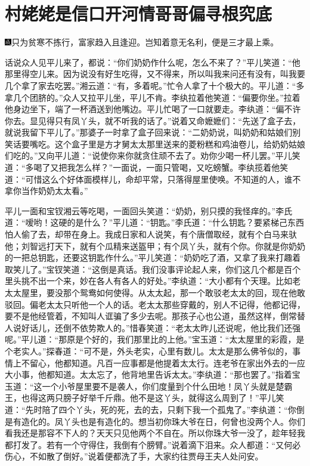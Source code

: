 

\chapter{村姥姥是信口开河\hspace{.5em}情哥哥偏寻根究底}

{\includegraphics[width=3mm]{../Images/00005}只为贫寒不拣行，富家趋入且逢迎。岂知着意无名利，便是三才最上乘。}

话说众人见平儿来了，都说：``你们奶奶作什么呢，怎么不来了？''平儿笑道：``他那里得空儿来。因为说没有好生吃得，又不得来，所以叫我来问还有没有，叫我要几个拿了家去吃罢。''湘云道：``有，多着呢。''忙令人拿了十个极大的。平儿道：``多拿几个团脐的。''众人又拉平儿坐，平儿不肯。李纨拉着他笑道：``偏要你坐。''拉着他身边坐下，端了一杯酒送到他嘴边。平儿忙喝了一口就要走。李纨道：``偏不许你去。显见得只有凤丫头，就不听我的话了。''说着又命嬷嬷们：``先送了盒子去，就说我留下平儿了。''那婆子一时拿了盒子回来说：``二奶奶说，叫奶奶和姑娘们别笑话要嘴吃。这个盒子里是方才舅太太那里送来的菱粉糕和鸡油卷儿，给奶奶姑娘们吃的。''又向平儿道：``说使你来你就贪住顽不去了。劝你少喝一杯儿罢。''平儿笑道：``多喝了又把我怎么样？''一面说，一面只管喝，又吃螃蟹。李纨揽着他笑道：``可惜这么个好体面模样儿，命却平常，只落得屋里使唤。不知道的人，谁不拿你当作奶奶太太看。''

平儿一面和宝钗湘云等吃喝，一面回头笑道：``奶奶，别只摸的我怪痒的。''李氏道：``嗳哟！这硬的是什么？''平儿道：``钥匙。''李氏道：``什么钥匙？要紧梯己东西怕人偷了去，却带在身上。我成日家和人说笑，有个唐僧取经，就有个白马来驮他；刘智远打天下，就有个瓜精来送盔甲；有个凤丫头，就有个你。你就是你奶奶的一把总钥匙，还要这钥匙作什么。''平儿笑道：``奶奶吃了酒，又拿了我来打趣着取笑儿了。''宝钗笑道：``这倒是真话。我们没事评论起人来，你们这几个都是百个里头挑不出一个来，妙在各人有各人的好处。''李纨道：``大小都有个天理。比如老太太屋里，要没那个鸳鸯如何使得。从太太起，那一个敢驳老太太的回，现在他敢驳回。偏老太太只听他一个人的话。老太太那些穿戴的，别人不记得，他都记得，要不是他经管着，不知叫人诓骗了多少去呢。那孩子心也公道，虽然这样，倒常替人说好话儿，还倒不依势欺人的。''惜春笑道：``老太太昨儿还说呢，他比我们还强呢。''平儿道：``那原是个好的，我们那里比的上他。''宝玉道：``太太屋里的彩霞，是个老实人。''探春道：``可不是，外头老实，心里有数儿。太太是那么佛爷似的，事情上不留心，他都知道。凡百一应事都是他提着太太行。连老爷在家出外去的一应大小事，他都知道。太太忘了，他背地里告诉太太。''李纨道：``那也罢了。''指着宝玉道：``这一个小爷屋里要不是袭人，你们度量到个什么田地！凤丫头就是楚霸王，也得这两只膀子好举千斤鼎。他不是这丫头，就得这么周到了！''平儿笑道：``先时陪了四个丫头，死的死，去的去，只剩下我一个孤鬼了。''李纨道：``你倒是有造化的。凤丫头也是有造化的。想当初你珠大爷在日，何曾也没两个人。你们看我还是那容不下人的？天天只见他两个不自在。所以你珠大爷一没了，趁年轻我都打发了。若有一个守得住，我倒有个膀臂。''说着滴下泪来。众人都道：``又何必伤心，不如散了倒好。''说着便都洗了手，大家约往贾母王夫人处问安。

